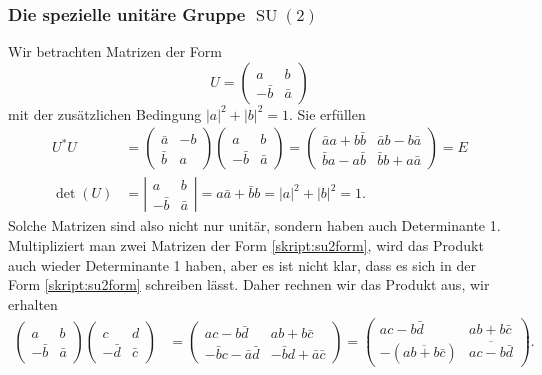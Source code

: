 \subsubsection{Die spezielle unitäre Gruppe $\operatorname{SU}(2)$}
Wir betrachten Matrizen der Form
\begin{equation}
U=
\begin{pmatrix}
a&b\\-\bar b&\bar a
\end{pmatrix}
\label{skript:su2form}
\end{equation}
mit der zusätzlichen Bedingung $|a|^2 + |b|^2=1$. Sie erfüllen
\begin{align*}
U^*U
&=
\begin{pmatrix}
\bar a&-b\\\bar b&a
\end{pmatrix}
\begin{pmatrix}
a&b\\-\bar b&\bar a
\end{pmatrix}
=
\begin{pmatrix}
\bar aa+b\bar b & \bar ab-b\bar a\\
\bar ba-a\bar b & \bar bb+a\bar a
\end{pmatrix}
=
E
\\
\det(U)&=\left|
\begin{matrix}
a&b\\-\bar b&\bar a
\end{matrix}
\right|
=
a\bar a+\bar bb = |a|^2 + |b|^2=1.
\end{align*}
Solche Matrizen sind also nicht nur unitär, sondern haben auch Determinante 1.
Multipliziert man zwei Matrizen der Form \eqref{skript:su2form},
wird das Produkt auch wieder Determinante 1 haben, aber es ist nicht klar,
dass es sich in der Form \eqref{skript:su2form} schreiben lässt.
Daher rechnen wir das Produkt aus, wir erhalten
\begin{align*}
\begin{pmatrix}  a                        & b                      \\
                 -\bar b                  & \bar a                 \end{pmatrix}
\begin{pmatrix}  c                        & d                      \\
                 -\bar d                  & \bar c                 \end{pmatrix}
&=
\begin{pmatrix}  ac-b\bar d               & ab+b\bar c             \\
                 -\bar bc-\bar a\bar d    & -\bar bd +\bar a\bar c \end{pmatrix}
=
\begin{pmatrix}  ac-b\bar d               & ab+b\bar c             \\
                 -(\overline{ab+b\bar c}) & \overline{ac-b\bar d}  \end{pmatrix}
.
\end{align*}
